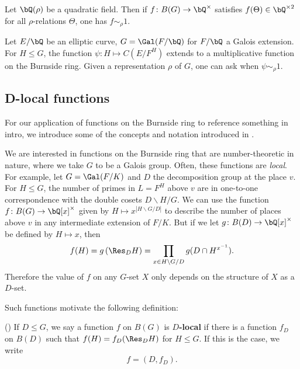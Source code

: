 \begin{example}
Let $\bQ(\rho)$ be a quadratic field. Then if $f \colon B(G) \to \bQ^{\times}$ satisfies $f(\Theta) \in \bQ^{\times 2}$ for all $\rho$-relations $\Theta$, one has $f \sim_{\rho} 1$.
\end{example}

\begin{example}
Let $E / \bQ$ be an elliptic curve, $G = \Gal(F / \bQ)$ for $F / \bQ$ a Galois extension. For $H \leq G$, the function $\psi \colon H \mapsto C(E / F^H)$ extends to a multiplicative function on the Burnside ring. Given a representation $\rho$ of $G$, one can ask when $\psi \sim_{\rho} 1$.
\end{example}

\subsection{D-local functions}\label{D-loc}

For our application of functions on the Burnside ring to {\color{red} reference something in intro}, we introduce some of the concepts and notation introduced in \cite[Section 2.iii]{reg-const}.

We are interested in functions on the Burnside ring that are number-theoretic in nature, where we take $G$ to be a Galois group. Often, these functions are \textit{local}. For example, let $G = \Gal(F / K)$ and $D$ the decomposition group at the place $v$. For $H \leq G$, the number of primes in $L = F^{H}$ above $v$ are in one-to-one correspondence with the double cosets $D \backslash H / G$. We can use the function $f \colon B(G) \to \bQ[x]^{\times}$ given by $H \mapsto  x^{| H \backslash G / D|}$ to describe the number of places above $v$ in any intermediate extension of $F / K$. But if we let $g \colon B(D) \to \bQ[x]^{\times}$ be defined by $H \mapsto x$, then 
        \[ f(H) = g\left(\Res_D H\right) = \prod_{x \in H \backslash G / D} g(D \cap H^{x^{-1}}) .\]
Therefore the value of $f$ on any $G$-set $X$ only depends on the structure of $X$ as a $D$-set. 

Such functions motivate the following definition:

\begin{defn}(\cite[Definition 2.33]{reg-const})\label{D-loc-fn}
    If $D \leq G$, we say a function $f$ on $B(G)$ is \textbf{$D$-local} if there is a function $f_D$ on $B(D)$ such that $f(H) = f_D(\Res_D H)$ for $H \leq G$.
    If this is the case, we write
    \[ f = (D, f_D). \]
\end{defn}

